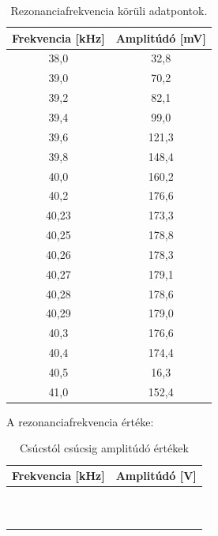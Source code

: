 \documentclass{article}
\begin{document}
\begin{table}[h!]
    \centering
    \begin{tabular}{|c|c|}
        \hline
        Frekvencia [kHz] & Amplitúdó [mV] \\ \hline
        38,0 & 32,8 \\ \hline
        39,0 & 70,2 \\ \hline
        39,2 & 82,1 \\ \hline
        39,4 & 99,0 \\ \hline
        39,6 & 121,3 \\ \hline
        39,8 & 148,4 \\ \hline
        40,0 & 160,2 \\ \hline
        40,2 & 176,6 \\ \hline
        40,23 & 173,3 \\ \hline
        40,25 & 178,8 \\ \hline
        40,26 & 178,3 \\ \hline
        40,27 & 179,1 \\ \hline
        40,28 & 178,6 \\ \hline
        40,29 & 179,0 \\ \hline
        40,3 & 176,6 \\ \hline
        40,4 & 174,4 \\ \hline
        40,5 & 16,3 \\ \hline
        41,0 & 152,4 \\ \hline
    \end{tabular}
    \caption{Rezonanciafrekvencia körüli adatpontok.}
    \label{rezonancia freki}
\end{table}


A rezonanciafrekvencia értéke:


\begin{table}[h!]
    \centering
    \begin{tabular}{|c|c|}
        \hline
        Frekvencia [kHz] & Amplitúdó [V] \\ \hline
         &  \\ \hline
         &  \\ \hline
         &  \\ \hline
         &  \\ \hline
         &  \\ \hline

         &  \\ \hline
         &  \\ \hline
         &  \\ \hline
         &  \\ \hline
         &  \\ \hline
    \end{tabular}
    \caption{Csúcstól csúcsig amplitúdó értékek}
    \label{Vpp}
\end{table}
\end{document}
